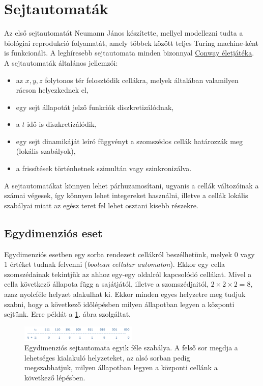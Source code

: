 \documentclass[12pt]{article}
\theoremstyle{plain}
\begin{document}
\section{Sejtautomaták}
\label{sec:cellular_automatons}
Az első sejtautomatát Neumann János készítette, mellyel modellezni tudta a biológiai reprodukció folyamatát, amely többek között teljes Turing machine-ként is funkcionált. A leghíresebb sejtautomata minden bizonnyal \href{https://en.wikipedia.org/wiki/Conway's_Game_of_Life}{Conway életjátéka}. A sejtautomaták általános jellemzói:

\begin{itemize}
\item az $x,y,z$ folytonos tér felosztódik cellákra, melyek általában valamilyen rácson helyezkednek el,
\item egy sejt állapotát jelző funkciók diszkretizálódnak,
\item a $t$ idő is diszkretizálódik,
\item egy sejt dinamikáját leíró függvényt a szomszédos cellák határozzák meg (lokális szabályok),
\item a frissítések történhetnek szimultán vagy szinkronizálva. 
\end{itemize}

A sejtautomatákat könnyen lehet párhuzamosítani, ugyanis a cellák változóinak a számai végesek, így könnyen lehet integereket használni, illetve a cellák lokális szabályai miatt az egész teret fel lehet osztani kisebb részekre. 

\subsection{Egydimenziós eset}
Egydimenziós esetben egy sorba rendezett cellákról beszélhetünk, melyek 0 vagy 1 értéket tudnak felvenni (\textit{boolean cellular automaton}). Ekkor egy cella szomszédainak tekintjük az ahhoz egy-egy oldalról kapcsolódó cellákat.  Mivel a cella következő állapota függ a sajátjától, illetve a szomszédjaitól,  $2 \times 2 \times 2 = 8$, azaz nyolcféle helyzet alakulhat ki. Ekkor minden egyes helyzetre meg tudjuk szabni, hogy a következő időlépésben milyen állapotban legyen a központi sejtünk. Erre példát a \ref{fig:1dimca}. ábra szolgáltat. 


\begin{figure}[H]
    \begin{center}
    \includegraphics[width=0.5\textwidth]{media/1dimca.png}
    \caption{Egydimenziós sejtautomata egyik féle szabálya. A felső sor megdja a lehetséges kialakuló helyzeteket, az alsó sorban pedig megszabhatjuk, milyen állapotban legyen a központi cellánk a következő lépésben. } 
    \label{fig:1dimca}
    \end{center}
\end{figure}
\end{document}
